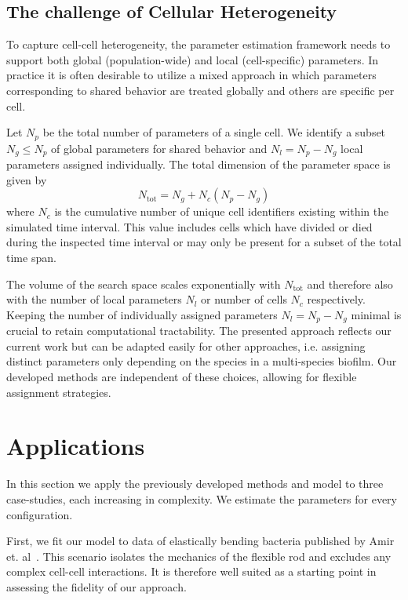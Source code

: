 \subsection{The challenge of Cellular Heterogeneity}
\label{sec:role-of-heterogeneity}
To capture cell-cell heterogeneity, the parameter estimation framework needs to
support both global
(population-wide) and local (cell-specific) parameters.
In practice it is often desirable to utilize a mixed approach in which parameters
corresponding to
shared behavior are treated globally and others are specific per cell.

Let $N_p$ be the total number of parameters of a single cell.
We identify a subset $N_g\leq N_p$ of global parameters for shared behavior and
$N_l=N_p-N_g$ local
parameters assigned individually.
The total dimension of the parameter space is given by
\begin{equation}
    N_\text{tot} = N_g + N_c (N_p - N_g)
\end{equation}
where $N_c$ is the cumulative number of unique cell identifiers existing within the
simulated time
interval.
This value includes cells which have divided or died during the inspected time
interval or may only
be present for a subset of the total time span.

The volume of the search space scales exponentially with $N_\text{tot}$ and therefore
also with the
number of local parameters $N_l$ or number of cells $N_c$ respectively.
Keeping the number of individually assigned parameters $N_l=N_p-N_g$ minimal is
crucial to retain
computational tractability.
The presented approach reflects our current work but can be adapted easily for other approaches,
i.e. assigning distinct parameters only depending on the species in a multi-species biofilm.
Our developed methods are independent of these choices, allowing for flexible
assignment strategies.

\section{Applications}

In this section we apply the previously developed methods and model to three case-studies, each
increasing in complexity.
We estimate the parameters for every configuration.

First, we fit our model to data of elastically bending bacteria published by Amir et.
al~\cite{Amir2014,Amir2014_2}.
This scenario isolates the mechanics of the flexible rod and excludes any complex cell-cell
interactions.
It is therefore well suited as a starting point in assessing the fidelity of our approach.

